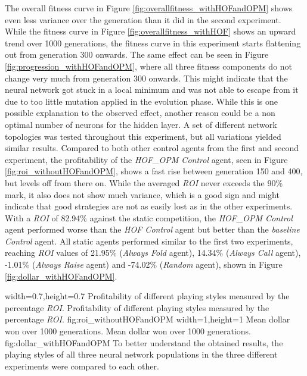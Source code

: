 The overall fitness curve in Figure \ref{fig:overallfitness_withHOFandOPM} shows even less variance over the generation than it did in the second experiment. While the fitness curve in Figure \ref{fig:overallfitness_withHOF} shows an upward trend over 1000 generations, the fitness curve in this experiment starts flattening out from generation 300 onwards. The same effect can be seen in Figure \ref{fig:progression_withHOFandOPM}, where all three fitness components do not change very much from generation 300 onwards. This might indicate that the neural network got stuck in a local minimum and was not able to escape from it due to too little mutation applied in the evolution phase. While this is one possible explanation to the observed effect, another reason could be a non optimal number of neurons for the hidden layer. A set of different network topologies was tested throughout this experiment, but all variations yielded similar results. Compared to both other control agents from the first and second experiment, the profitability of the \textit{HOF\_OPM Control} agent, seen in Figure \ref{fig:roi_withoutHOFandOPM}, shows a fast rise between generation 150 and 400, but levels off from there on. While the averaged \textit{ROI} never exceeds the 90\% mark, it also does not show much variance, which is a good sign and might indicate that good strategies are not as easily lost as in the other experiments. With a \textit{ROI} of 82.94\% against the static competition, the \textit{HOF\_OPM Control} agent performed worse than the \textit{HOF Control} agent but better than the \textit{baseline Control} agent. All static agents performed similar to the first two experiments, reaching \textit{ROI} values of 21.95\% (\textit{Always Fold} agent), 14.34\% (\textit{Always Call} agent), -1.01\% (\textit{Always Raise} agent) and -74.02\% (\textit{Random} agent), shown in Figure \ref{fig:dollar_withHOFandOPM}.\par
{}%
  {width=0.7\textwidth,height=0.7\textheight}%
  {Profitability of different playing styles measured by the percentage \textit{ROI}.}%
  {Profitability of different playing styles measured by the percentage \textit{ROI}.}%
  {fig:roi_withoutHOFandOPM}%
  {width=1\textwidth,height=1\textheight}%
  {Mean dollar won over 1000 generations.}%
  {Mean dollar won over 1000 generations.}%
  {fig:dollar_withHOFandOPM}%
 To better understand the obtained results, the playing styles of all three neural network populations in the three different experiments were compared to each other. 
